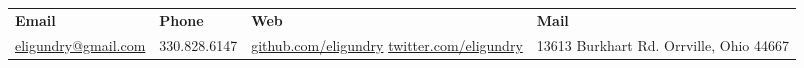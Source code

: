 \begin{tabularx}{\textwidth}{ X X X X }
	\textbf{Email} & \textbf{Phone} & \textbf{Web} & \textbf{Mail} \\
	\href{mailto:eligundry@gmail.com}{eligundry@gmail.com} &
	330.828.6147 &
	\href{https://github.com/eligundry}{github.com/eligundry} \newline
	\href{https://twitter.com/EliGundry}{twitter.com/eligundry} &
	13613 Burkhart Rd.\newline
	Orrville, Ohio 44667 \\
\end{tabularx}
